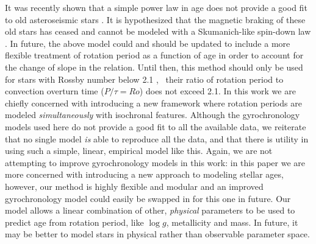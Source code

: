 It was recently shown that a simple power law in age does not provide a good
fit to old asteroseismic stars \citep{angus2015, vansaders2016}.
It is hypothesized that the magnetic braking of these old stars has ceased and
cannot be modeled with a Skumanich-like spin-down law \citep{vansaders2016}.
In future, the above model could and should be updated to include a more
flexible treatment of rotation period as a function of age in order to account
for the change of slope in the relation.
Until then, this method should only be used for stars with Rossby number below
2.1 \citep{vansaders2016}, \ie\ their ratio of rotation period to convection
overturn time ($P/\tau = Ro$) does not exceed 2.1.
In this work we are chiefly concerned with introducing a new framework where
rotation periods are modeled {\it simultaneously} with isochronal features.
Although the gyrochronology models used here do not provide a good fit to all
the available data, we reiterate that no single model {\it is} able to
reproduce all the data, and that there is utility in using such a simple,
linear, empirical model like this.
Again, we are not attempting to improve gyrochronology models in this work: in
this paper we are more concerned with introducing a new approach to modeling
stellar ages, however, our method is highly flexible and modular and an
improved gyrochronology model could easily be swapped in for this one in
future.
Our model allows a linear combination of other, {\it physical} parameters to
be used to predict age from rotation period, like $\log g$, metallicity and
mass.
In future, it may be better to model stars in physical rather than observable
parameter space.


